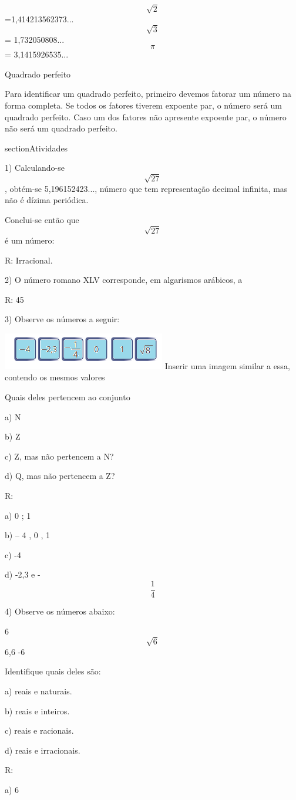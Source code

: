 \[\sqrt{2}\]=1,414213562373...
\[\sqrt{3}\] = 1,732050808...
\[\pi\] = 3,1415926535...

Quadrado perfeito

Para identificar um quadrado perfeito, primeiro devemos fatorar um
número na forma completa. Se todos os fatores tiverem expoente par, o
número será um quadrado perfeito. Caso um dos fatores não apresente
expoente par, o número não será um quadrado perfeito.

section{Atividades}

1) Calculando-se \[\sqrt{27}\] , obtém-se 5,196152423..., número que tem
representação decimal infinita, mas não é dízima periódica.

Conclui-se então que \[\sqrt{27}\] é um número:

R: Irracional.

2) O número romano XLV corresponde, em algarismos arábicos, a

R: 45

3) Observe os números a seguir:

\includegraphics[width=2.79167in,height=0.63542in]{./imgSAEB_8_MAT/media/image1.png}
Inserir uma imagem similar a essa, contendo os mesmos valores

Quais deles pertencem ao conjunto

a) N

b) Z

c) Z, mas não pertencem a N?

d) Q, mas não pertencem a Z?

R:

a) 0 ; 1

b) -- 4 , 0 , 1

c) -4

d) -2,3 e - \[\frac{1}{4}\]

4) Observe os números abaixo:

6 \[\sqrt{6}\] 6,6 -6

Identifique quais deles são:

a) reais e naturais.

b) reais e inteiros.

c) reais e racionais.

d) reais e irracionais.

R:

a) 6


